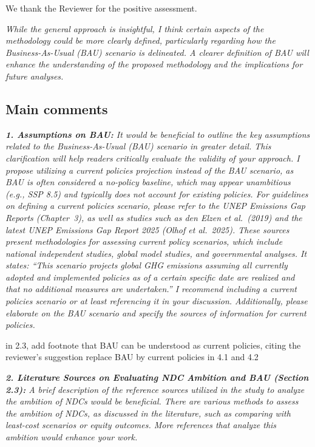 \documentclass[11pt]{article}
\newenvironment{italic}{\itshape}{\par}
\begin{document}
We thank the Reviewer for the positive assessment.



\begin{italic}
While the general approach is insightful, I think certain aspects of the methodology could be more clearly defined, particularly regarding how the Business-As-Usual (BAU) scenario is delineated. A clearer definition of BAU will enhance the understanding of the proposed methodology and the implications for future analyses.
\end{italic}






\subsection*{Main comments}

\begin{italic}
\textbf{1. Assumptions on BAU:} It would be beneficial to outline the key assumptions related to the Business-As-Usual (BAU) scenario in greater detail. This clarification will help readers critically evaluate the validity of your approach. I propose utilizing a current policies projection instead of the BAU scenario, as BAU is often considered a no-policy baseline, which may appear unambitious (e.g., SSP 8.5) and typically does not account for existing policies. For guidelines on defining a current policies scenario, please refer to the UNEP Emissions Gap Reports (Chapter~3), as well as studies such as den Elzen et al.\ (2019) and the latest UNEP Emissions Gap Report 2025 (Olhof et al.\ 2025). These sources present methodologies for assessing current policy scenarios, which include national independent studies, global model studies, and governmental analyses. It states: ``This scenario projects global GHG emissions assuming all currently adopted and implemented policies as of a certain specific date are realized and that no additional measures are undertaken.'' I recommend including a current policies scenario or at least referencing it in your discussion. Additionally, please elaborate on the BAU scenario and specify the sources of information for current policies.
\end{italic}

in 2.3, add footnote that BAU can be understood as current policies, citing the reviewer's suggestion
replace BAU by current policies in 4.1 and 4.2  




\begin{italic}
\textbf{2. Literature Sources on Evaluating NDC Ambition and BAU (Section 2.3):} A brief description of the reference sources utilized in the study to analyze the ambition of NDCs would be beneficial. There are various methods to assess the ambition of NDCs, as discussed in the literature, such as comparing with least-cost scenarios or equity outcomes. More references that analyze this ambition would enhance your work.
\end{italic}
\end{document}
